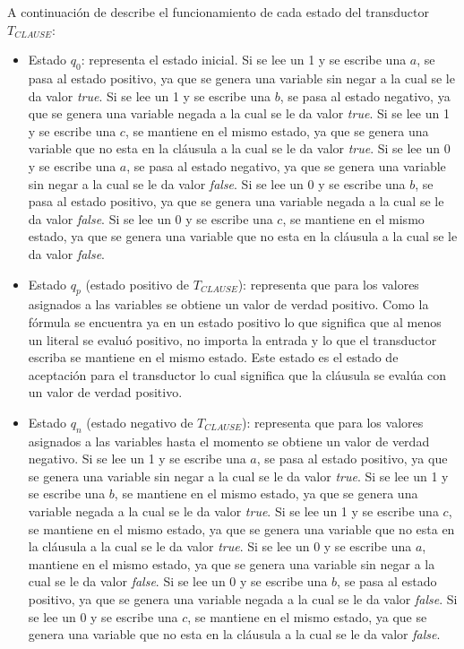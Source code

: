 \documentclass[12pt]{article}
\newcommand{\true}{\textit{true}}
\newcommand{\false}{\textit{false}}
\begin{document}
A continuación de describe el funcionamiento de cada estado del transductor $T_{CLAUSE}$:
\begin{itemize}
    \item Estado $q_0$: representa el estado inicial.
          Si se lee  un 1 y se escribe una $a$, se pasa al estado positivo, ya que se genera una variable sin negar a la cual se le da valor \true{}.
          Si se lee  un 1 y se escribe una $b$, se pasa al estado negativo, ya que se genera una variable negada a la cual se le da valor \true{}.
          Si se lee  un 1 y se escribe una $c$, se mantiene en el mismo estado, ya que se genera una variable que no esta en la cláusula a la cual se le da valor \true{}.
          Si se lee  un 0 y se escribe una $a$, se pasa al estado negativo, ya que se genera una variable sin negar a la cual se le da valor \false{}.
          Si se lee  un 0 y se escribe una $b$, se pasa al estado positivo, ya que se genera una variable negada a la cual se le da valor \false{}.
          Si se lee  un 0 y se escribe una $c$, se mantiene en el mismo estado, ya que se genera una variable que no esta en la cláusula a la cual se le da valor \false{}.
          
    \item Estado $q_p$ (estado positivo de $T_{CLAUSE}$): representa que para los valores asignados a las variables se obtiene un valor de verdad positivo.  Como la fórmula se encuentra ya en un estado positivo lo que significa que al menos un literal se evaluó positivo, no importa la entrada y lo que el transductor escriba se mantiene en el mismo estado. Este estado es el estado de aceptación para el transductor lo cual significa que la cláusula se evalúa con un valor de verdad positivo.
          
    \item Estado $q_n$ (estado negativo de $T_{CLAUSE}$): representa que para los valores asignados a las variables hasta el momento se obtiene un valor de verdad negativo.
          Si se lee  un 1 y se escribe una $a$, se pasa al estado positivo, ya que se genera una variable sin negar a la cual se le da valor \true{}.
          Si se lee  un 1 y se escribe una $b$, se mantiene en el mismo estado, ya que se genera una variable negada a la cual se le da valor \true{}.
          Si se lee  un 1 y se escribe una $c$, se mantiene en el mismo estado, ya que se genera una variable que no esta en la cláusula a la cual se le da valor \true{}.
          Si se lee  un 0 y se escribe una $a$, mantiene en el mismo estado, ya que se genera una variable sin negar a la cual se le da valor \false{}.
          Si se lee  un 0 y se escribe una $b$, se pasa al estado positivo, ya que se genera una variable negada a la cual se le da valor \false{}.
          Si se lee  un 0 y se escribe una $c$, se mantiene en el mismo estado, ya que se genera una variable que no esta en la cláusula a la cual se le da valor \false{}.
          
\end{itemize}
\end{document}
